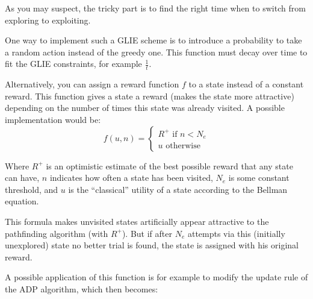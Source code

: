 \documentclass{llncs}
\begin{document}
As you may suspect, the tricky part is to find the right time when to switch from exploring to exploiting.\par

One way to implement such a GLIE scheme is to introduce a probability to take a random action instead of the greedy one. This function must decay over time to fit the GLIE constraints, for example $\frac{1}{t}$.\par

Alternatively, you can assign a reward function $f$ to a state instead of a constant reward. This function gives a state a reward (makes the state more attractive) depending on the number of times this state was already visited. A possible implementation would be:
\begin{equation*}
	f(u,n)=\begin{cases}
	R^+ \text{ if } n<N_e\\
	u \text{ otherwise }
	\end{cases}
\end{equation*}
 


Where $R^+$ is an optimistic estimate of the best possible reward that any state can have, $n$ indicates how often a state has been visited, $N_e$ is some constant threshold, and $u$ is the “classical” utility of a state according to the Bellman equation.\par


This formula makes unvisited states artificially appear attractive to the pathfinding algorithm (with $R^+$). But if after $N_e$ attempts via this (initially unexplored) state no better trial is found, the state is assigned with his original reward.\par

A possible application of this function is for example to modify the update rule of the ADP algorithm, which then becomes:
\end{document}
